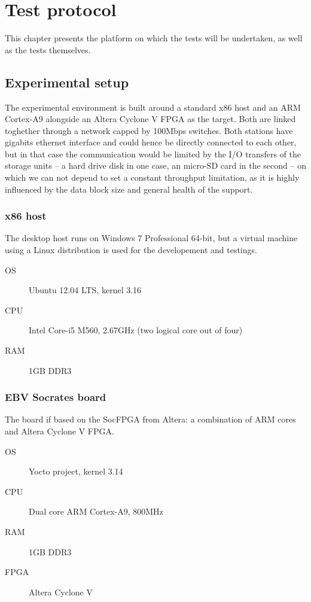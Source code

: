 \chapter{Test protocol}\label{chap:test-protocol}
This chapter presents the platform on which the tests will be undertaken, as well as the tests themselves.



\section{Experimental setup}
The experimental environment is built around a standard x86 host and an ARM Cortex-A9 alongside an Altera Cyclone V FPGA as the target.
Both are linked toghether through a network capped by 100Mbps switches.
Both stations have gigabits ethernet interface and could hence be directly connected to each other, but in that case the communication would be limited by the I/O transfers of the storage units -- a hard drive disk in one case, an micro-SD card in the second -- on which we can not depend to set a constant throughput limitation, as it is highly influenced by the data block size and general health of the support.


\subsection{x86 host}
The desktop host runs on Windows 7 Professional 64-bit, but a virtual machine using a Linux distribution is used for the developement and testings.

\begin{framed}
\begin{description}
	\item[OS] Ubuntu 12.04 LTS, kernel 3.16
	\item[CPU] Intel Core-i5 M560, 2.67GHz (two logical core out of four)
	\item[RAM] 1GB DDR3
\end{description}
\end{framed}

\subsection{EBV Socrates board}
The board if based on the SocFPGA from Altera: a combination of ARM cores and Altera Cyclone V FPGA.

\begin{framed}
\begin{description}
	\item[OS] Yocto project, kernel 3.14
	\item[CPU] Dual core ARM Cortex-A9, 800MHz
	\item[RAM] 1GB DDR3
	\item[FPGA] Altera Cyclone V
\end{description}
\end{framed}

